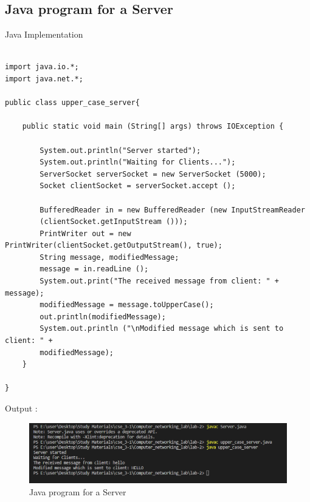 \documentclass[11pt]{article}
\begin{document}
\subsection{Java program for a Server}
Java Implementation \\[2pt]
\begin{verbatim}
    
import java.io.*;
import java.net.*;

public class upper_case_server{

    public static void main (String[] args) throws IOException {

        System.out.println("Server started");
        System.out.println("Waiting for Clients...");
        ServerSocket serverSocket = new ServerSocket (5000);
        Socket clientSocket = serverSocket.accept ();

        BufferedReader in = new BufferedReader (new InputStreamReader 
        (clientSocket.getInputStream ()));
        PrintWriter out = new PrintWriter(clientSocket.getOutputStream(), true);
        String message, modifiedMessage;
        message = in.readLine ();
        System.out.print("The received message from client: " + message);
        modifiedMessage = message.toUpperCase();
        out.println(modifiedMessage);
        System.out.println ("\nModified message which is sent to client: " + 
        modifiedMessage);
    }

}
\end{verbatim}

 Output : 
\begin{figure}[!h]
\centering
\includegraphics[width=\textwidth]{upper_server.png}
\caption{Java program for a Server}
\end{figure}
\FloatBarrier
\end{document}
